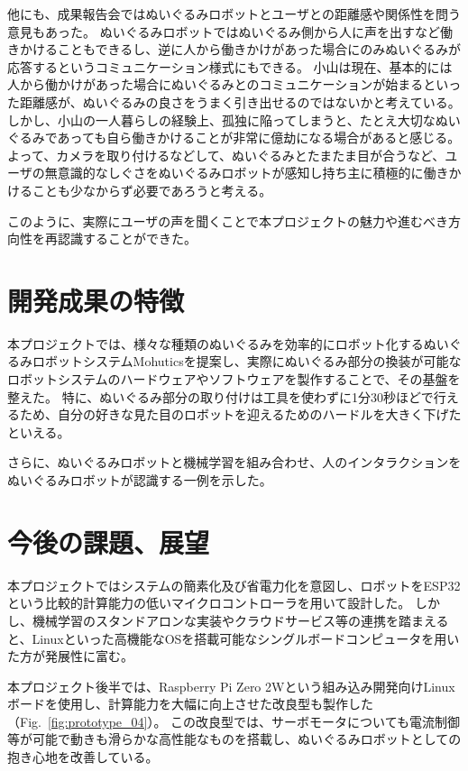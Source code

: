 \documentclass[uplatex,a4paper,12pt]{jsarticle}
\renewcommand{\figurename}{Fig.}
\newcommand{\figref}[1]{\figurename~\ref{#1}}
\begin{document}
他にも、成果報告会ではぬいぐるみロボットとユーザとの距離感や関係性を問う意見もあった。
ぬいぐるみロボットではぬいぐるみ側から人に声を出すなど働きかけることもできるし、逆に人から働きかけがあった場合にのみぬいぐるみが応答するというコミュニケーション様式にもできる。
小山は現在、基本的には人から働かけがあった場合にぬいぐるみとのコミュニケーションが始まるといった距離感が、ぬいぐるみの良さをうまく引き出せるのではないかと考えている。
しかし、小山の一人暮らしの経験上、孤独に陥ってしまうと、たとえ大切なぬいぐるみであっても自ら働きかけることが非常に億劫になる場合があると感じる。
よって、カメラを取り付けるなどして、ぬいぐるみとたまたま目が合うなど、ユーザの無意識的なしぐさをぬいぐるみロボットが感知し持ち主に積極的に働きかけることも少なからず必要であろうと考える。

このように、実際にユーザの声を聞くことで本プロジェクトの魅力や進むべき方向性を再認識することができた。

\section{開発成果の特徴}
本プロジェクトでは、様々な種類のぬいぐるみを効率的にロボット化するぬいぐるみロボットシステムMohuticsを提案し、実際にぬいぐるみ部分の換装が可能なロボットシステムのハードウェアやソフトウェアを製作することで、その基盤を整えた。
特に、ぬいぐるみ部分の取り付けは工具を使わずに1分30秒ほどで行えるため、自分の好きな見た目のロボットを迎えるためのハードルを大きく下げたといえる。

さらに、ぬいぐるみロボットと機械学習を組み合わせ、人のインタラクションをぬいぐるみロボットが認識する一例を示した。


\section{今後の課題、展望}\label{sec:challenges}
本プロジェクトではシステムの簡素化及び省電力化を意図し、ロボットをESP32という比較的計算能力の低いマイクロコントローラを用いて設計した。
しかし、機械学習のスタンドアロンな実装やクラウドサービス等の連携を踏まえると、Linuxといった高機能なOSを搭載可能なシングルボードコンピュータを用いた方が発展性に富む。

本プロジェクト後半では、Raspberry Pi Zero 2Wという組み込み開発向けLinuxボードを使用し、計算能力を大幅に向上させた改良型も製作した（\figref{fig:prototype_04}）。
この改良型では、サーボモータについても電流制御等が可能で動きも滑らかな高性能なものを搭載し、ぬいぐるみロボットとしての抱き心地を改善している。
\end{document}
